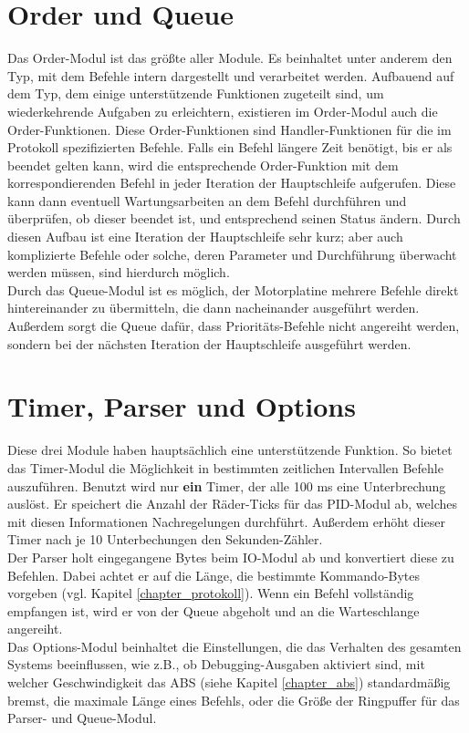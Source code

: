 \section{Order und Queue}
Das Order-Modul ist das größte aller Module. Es beinhaltet unter anderem den Typ, mit dem Befehle
intern dargestellt und verarbeitet werden. Aufbauend auf dem Typ, dem einige unterstützende
Funktionen zugeteilt sind, um wiederkehrende Aufgaben zu erleichtern, existieren im Order-Modul
auch die Order-Funktionen. Diese Order-Funktionen sind Handler-Funktionen für die
im Protokoll spezifizierten Befehle. Falls ein Befehl längere Zeit benötigt, bis er als beendet
gelten kann, wird die entsprechende Order-Funktion mit dem korrespondierenden Befehl in jeder
Iteration der Hauptschleife aufgerufen. Diese kann dann eventuell Wartungsarbeiten an dem
Befehl durchführen und überprüfen, ob dieser beendet ist, und entsprechend seinen Status ändern.
Durch diesen Aufbau ist eine Iteration der Hauptschleife sehr kurz; aber auch komplizierte Befehle
oder solche, deren Parameter und Durchführung überwacht werden müssen, sind hierdurch möglich.\\
Durch das Queue-Modul ist es möglich, der Motorplatine mehrere Befehle direkt hintereinander
zu übermitteln, die dann nacheinander ausgeführt werden. Außerdem sorgt die
Queue dafür, dass Prioritäts-Befehle nicht angereiht werden, sondern bei der nächsten
Iteration der Hauptschleife ausgeführt werden.
\section{Timer, Parser und Options}
Diese drei Module haben hauptsächlich eine unterstützende Funktion. So bietet das Timer-Modul
die Möglichkeit in bestimmten zeitlichen Intervallen Befehle auszuführen. Benutzt wird
nur \textbf{ein} Timer, der alle 100 ms eine Unterbrechung auslöst. Er speichert die Anzahl
der Räder-Ticks für das PID-Modul ab, welches mit diesen Informationen Nachregelungen durchführt.
Außerdem erhöht dieser Timer nach je 10 Unterbechungen den Sekunden-Zähler.\\
Der Parser holt eingegangene Bytes beim IO-Modul ab und konvertiert diese zu Befehlen. Dabei
achtet er auf die Länge, die bestimmte Kommando-Bytes vorgeben (vgl. Kapitel \ref{chapter_protokoll}).
Wenn ein Befehl vollständig empfangen ist, wird er von der Queue abgeholt und an die Warteschlange angereiht.\\
Das Options-Modul beinhaltet die Einstellungen, die das Verhalten des gesamten Systems beeinflussen, wie
z.B., ob Debugging-Ausgaben aktiviert sind, mit welcher Geschwindigkeit das ABS (siehe Kapitel \ref{chapter_abs})
standardmäßig bremst,
die maximale Länge eines Befehls, oder die Größe der Ringpuffer für das Parser- und Queue-Modul.
